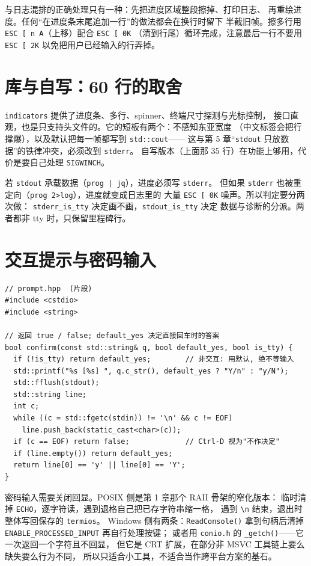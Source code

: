 \documentclass[12pt,a4paper,fontset=fandol]{ctexbook}
\newcommand{\Fn}[1]{\texttt{#1()}}
\newcommand{\Tp}[1]{\texttt{#1}}
\begin{document}
与日志混排的正确处理只有一种：先把进度区域整段擦掉、打印日志、
再重绘进度。任何``在进度条末尾追加一行''的做法都会在换行时留下
半截旧帧。擦多行用 \Tp{ESC [ n A}（上移）配合 \Tp{ESC [ 0K}
（清到行尾）循环完成，注意最后一行不要用 \Tp{ESC [ 2K}
以免把用户已经输入的行弄掉。

\section{库与自写：60 行的取舍}

\Tp{indicators} 提供了进度条、多行、spinner、终端尺寸探测与光标控制，
接口直观，也是只支持头文件的。它的短板有两个：不感知东亚宽度
（中文标签会把行撑爆），以及默认把每一帧都写到 \Tp{std::cout}——
这与第 5 章``\Tp{stdout} 只放数据''的铁律冲突，必须改到 \Tp{stderr}。
自写版本（上面那 35 行）在功能上够用，代价是要自己处理 \Tp{SIGWINCH}。

\begin{note}[title={进度条写 stderr 的三种流}]
若 \Tp{stdout} 承载数据（\Tp{prog | jq}），进度必须写 \Tp{stderr}。
但如果 \Tp{stderr} 也被重定向（\Tp{prog 2>log}），进度就变成日志里的
大量 \Tp{ESC [ 0K} 噪声。所以判定要分两次做：
\Tp{stderr\_is\_tty} 决定画不画，\Tp{stdout\_is\_tty} 决定
数据与诊断的分派。两者都非 tty 时，只保留里程碑行。
\end{note}

\section{交互提示与密码输入}

\begin{lstlisting}[caption={confirm 提示：默认值与 EOF 处理}]
// prompt.hpp  (片段)
#include <cstdio>
#include <string>

// 返回 true / false; default_yes 决定直接回车时的答案
bool confirm(const std::string& q, bool default_yes, bool is_tty) {
  if (!is_tty) return default_yes;        // 非交互: 用默认, 绝不等输入
  std::printf("%s [%s] ", q.c_str(), default_yes ? "Y/n" : "y/N");
  std::fflush(stdout);
  std::string line;
  int c;
  while ((c = std::fgetc(stdin)) != '\n' && c != EOF)
    line.push_back(static_cast<char>(c));
  if (c == EOF) return false;             // Ctrl-D 视为"不作决定"
  if (line.empty()) return default_yes;
  return line[0] == 'y' || line[0] == 'Y';
}
\end{lstlisting}

密码输入需要关闭回显。POSIX 侧是第 1 章那个 RAII 骨架的窄化版本：
临时清掉 \Tp{ECHO}，逐字符读，遇到退格自己把已存字符串缩一格，
遇到 \Tp{\textbackslash n} 结束，退出时整体写回保存的 \Tp{termios}。
Windows 侧有两条：\Fn{ReadConsole} 拿到句柄后清掉
\Tp{ENABLE\_PROCESSED\_INPUT} 再自行处理按键；
或者用 \Tp{conio.h} 的 \Fn{\_getch}——它一次返回一个字符且不回显，
但它是 CRT 扩展，在部分非 MSVC 工具链上要么缺失要么行为不同，
所以只适合小工具，不适合当作跨平台方案的基石。
\end{document}
